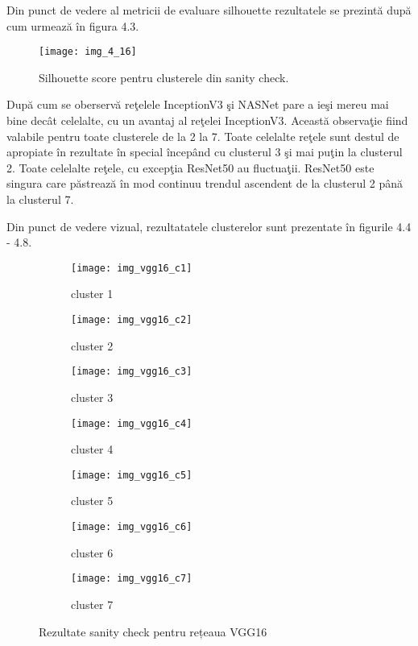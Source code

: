 Din punct de vedere al metricii de evaluare silhouette rezultatele se prezintă după cum urmează în figura 4.3.
\begin{figure}[!h]
	\centering
	\texttt{[image: img\_4\_16]}
	\caption[Silhouette score pentru clusterele din sanity check]{Silhouette score pentru clusterele din sanity check.}
\end{figure} 
După cum se oberservă reţelele InceptionV3 şi NASNet pare a ieşi
mereu mai bine decât celelalte, cu un avantaj al reţelei InceptionV3. Această observaţie
fiind valabile pentru toate clusterele de la 2 la 7. Toate celelalte reţele sunt destul de
apropiate în rezultate în special începând cu clusterul 3 şi mai puţin la clusterul 2. Toate
celelalte reţele, cu excepţia ResNet50 au fluctuaţii. ResNet50 este singura care păstrează
în mod continuu trendul ascendent de la clusterul 2 până la clusterul 7.

Din punct de vedere vizual, rezultatatele clusterelor sunt prezentate în figurile 4.4 - 4.8.
\begin{figure}[!h]
  \centering
  \begin{subfigure}[b]{0.45\textwidth}
    \texttt{[image: img\_vgg16\_c1]}
    \caption{cluster 1}
  \end{subfigure}
  \hfill
  \begin{subfigure}[b]{0.45\textwidth}
    \texttt{[image: img\_vgg16\_c2]}
    \caption{cluster 2}
  \end{subfigure}
   \hfill
  \begin{subfigure}[b]{0.45\textwidth}
    \texttt{[image: img\_vgg16\_c3]}
    \caption{cluster 3}
  \end{subfigure}
  \hfill
  \begin{subfigure}[b]{0.45\textwidth}
    \texttt{[image: img\_vgg16\_c4]}
    \caption{cluster 4}
  \end{subfigure}
  \hfill
  \begin{subfigure}[b]{0.45\textwidth}
    \texttt{[image: img\_vgg16\_c5]}
    \caption{cluster 5}
  \end{subfigure}
  \hfill
  \begin{subfigure}[b]{0.45\textwidth}
    \texttt{[image: img\_vgg16\_c6]}
    \caption{cluster 6}
  \end{subfigure}
    \hfill
  \begin{subfigure}[b]{0.45\textwidth}
    \texttt{[image: img\_vgg16\_c7]}
    \caption{cluster 7}
  \end{subfigure}
  \caption[Rezultate sanity check pentru rețeaua VGG16]{Rezultate sanity check pentru rețeaua VGG16}
\end{figure}

